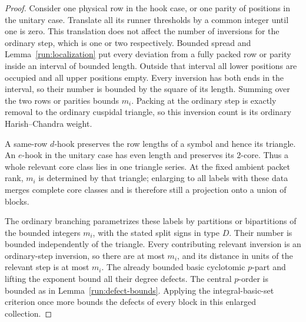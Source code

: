\begin{proof}
Consider one physical row in the hook case, or one parity
of positions in the unitary case.  Translate all its runner
thresholds by a common integer until one is zero.  This
translation does not affect the number of inversions for
the ordinary step, which is one or two respectively.
Bounded spread and Lemma~\ref{run:localization} put every
deviation from a fully packed row or parity inside an
interval of bounded length.  Outside that interval all
lower positions are occupied and all upper positions
empty.  Every inversion has both ends in the interval,
so their number is bounded by the square of its length.
Summing over the two rows or parities bounds \(m_i\).
Packing at the ordinary step is exactly removal to the
ordinary cuspidal triangle, so this inversion count is
its ordinary Harish--Chandra weight.

A same-row \(d\)-hook preserves the row lengths of a
symbol and hence its triangle.  An \(e\)-hook in the
unitary case has even length and preserves its \(2\)-core.
Thus a whole relevant core class lies in one triangle
series.  At the fixed ambient packet rank, \(m_i\) is
determined by that triangle; enlarging to all labels with
these data merges complete core classes and is therefore
still a projection onto a union of blocks.

The ordinary branching parametrizes these labels by
partitions or bipartitions of the bounded integers \(m_i\),
with the stated split signs in type \(D\).  Their number
is bounded independently of the triangle.
Every contributing relevant inversion is an ordinary-step
inversion, so there are at most \(m_i\), and its distance
in units of the relevant step is at most \(m_i\).
The already bounded basic cyclotomic \(p\)-part and lifting
the exponent bound all their degree defects.  The central
\(p\)-order is bounded as in
Lemma~\ref{run:defect-bounds}.  Applying the integral-basic-set
criterion once more bounds the defects of every block in
this enlarged collection.
\end{proof}

